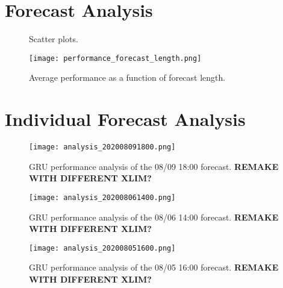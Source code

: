 \section{Forecast Analysis}
\begin{figure}[p!]
	\centering
	\hfill
	\hfill
	\hfill
	\hfill
	\caption{Scatter plots.}
	\label{fig:test_scatter_results}
\end{figure}

\begin{figure}[h!]
	\centering
	\texttt{[image: performance\_forecast\_length.png]}
	\caption{Average performance as a function of forecast length.}
	\label{fig:performance_forecast_length}
\end{figure}

\section{Individual Forecast Analysis}
\begin{figure}[h!]
	\centering
	\texttt{[image: analysis\_202008091800.png]}
	\caption{GRU performance analysis of the 08/09 18:00 forecast. \textbf{REMAKE WITH DIFFERENT XLIM?}}
	\label{fig:analysis_08091800}
\end{figure}

\begin{figure}[h!]
	\centering
	\texttt{[image: analysis\_202008061400.png]}
	\caption{GRU performance analysis of the 08/06 14:00 forecast. \textbf{REMAKE WITH DIFFERENT XLIM?}}
	\label{fig:analysis_08061400}
\end{figure}

\begin{figure}[h!]
	\centering
	\texttt{[image: analysis\_202008051600.png]}
	\caption{GRU performance analysis of the 08/05 16:00 forecast. \textbf{REMAKE WITH DIFFERENT XLIM?}}
	\label{fig:analysis_08051600}
\end{figure}